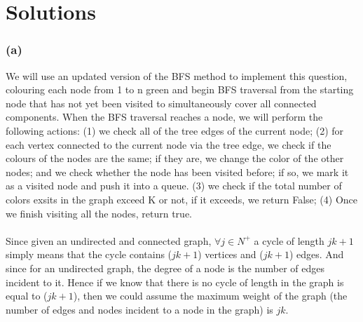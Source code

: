 \documentclass{article}
\begin{document}
\section*{Solutions}
\subsubsection*{(a)} 
We will use an updated version of the BFS method to implement this question, colouring each node from 1 to n green and begin BFS traversal from the starting node that has not yet been visited to simultaneously cover all connected components. When the BFS traversal reaches a node, we will perform the following actions: (1) we check all of the tree edges of the current node; (2) for each vertex connected to the current node via the tree edge, we check if the colours of the nodes are the same; if they are, we change the color of the other nodes; and we check whether the node has been visited before; if so, we mark it as a visited node and push it into a queue. (3) we check if the total number of colors exsits in the graph exceed K or not, if it exceeds, we return False; (4) Once we finish visiting all the nodes, return true.\\~\\
Since given an undirected and connected graph, $\forall j \in N^+$ a cycle of length $jk + 1$ simply means that the cycle contains ($jk + 1$) vertices and ($jk + 1$) edges. And since for an undirected graph, the degree of a node is the number of edges incident to it. Hence if we know that there is no cycle of length in the graph is equal to ($jk + 1$), then we could assume the maximum weight of the graph (the number of edges and nodes incident to a node in the graph) is $jk$.\\
\end{document}
